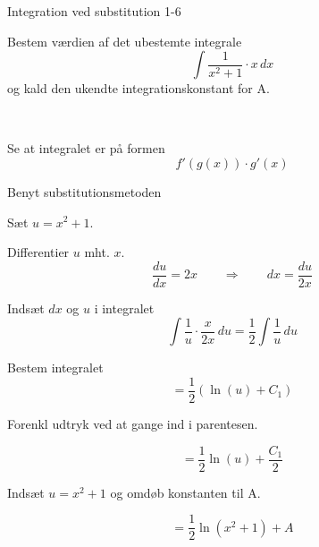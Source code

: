 \documentclass{article}
\begin{document}
\begin{exercise}{Integration ved substitution 1-6}
	
	
	Bestem værdien af det ubestemte integrale
	\[
	\int \frac{1}{x^2+1}\cdot x \, dx
	\]
	og kald den ukendte integrationskonstant for A.
	
	 \\
	
	
	
	\hint
	
	Se at integralet er på formen
	\[
	f'(g(x)) \cdot g'(x)
	\]
	
	\hint
	
	Benyt substitutionsmetoden
	
	\hint
	
	Sæt $u=x^2+1$.
	
	
	\hint
	
	Differentier $u$ mht. $x$.
	\[
	\frac{du}{dx} = 2x \qquad	\Rightarrow \qquad dx = \frac{du}{2x}
	\]
	
	\hint
	
	Indsæt $dx$ og $u$ i integralet
	\[
	\int \frac{1}{u} \cdot \frac{x}{2x} \, du = \frac{1}{2} \int \frac{1}{u} \, du
	\]
	
	\hint
	
	Bestem integralet
	\[
	= \frac{1}{2} \left( \ln(u) + C_1 \right)
	\]
	
	\hint
	Forenkl udtryk ved at gange ind i parentesen.
	
	\hint
	
	\[
	= \frac{1}{2} \ln(u) + \frac{C_1}{2}
	\]
	
	\hint
	
	Indsæt $u = x^2+1$ og omdøb konstanten  til A.
	
	\hint
	
	\[
	= \frac{1}{2} \ln(x^2+1) + A
	\]
	
	
\end{exercise}

\newpage
\end{document}
